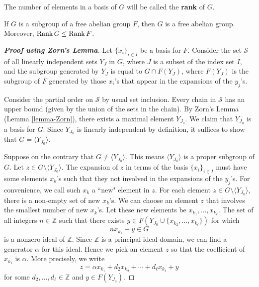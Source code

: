 \begin{definition}
	The number of elements in a basis of $G$ will be called
	the \textbf{rank} of $G$.
\end{definition}
\begin{theorem}  \label{thm-free-abelian-subgrp}
If $G$ is a subgroup of a free abelian group $F$, then $G$ is a free abelian group. Moreover, $\operatorname{Rank}  G \leq \operatorname{Rank}  F$.
\end{theorem}
\begin{proof}[\textbf{Proof using Zorn's Lemma}]
	Let $\{x_i\}_{i \in I}$ be a basis for $F$. Consider the set $\mathcal{S}$ of all linearly independent sets $Y_J$ in $G$, where $J$ is a subset of the index set $I$, and  the subgroup  generated by $Y_J$ is equal to $G \cap F(Y_J)$, where $F(Y_J)$ is the subgroup of $F$ generated by those $x_i$'s that appear in the expansions of the $y_j$'s.
	
	Consider the partial order on $\mathcal{S}$ by usual set inclusion. Every chain in $\mathcal{S}$ has an upper bound (given by the union of the sets in the chain). By Zorn's Lemma (Lemma \ref{lemma-Zorn}), there exists a maximal element $Y_{J_0}$.  We claim that $Y_{J_0}$ is a basis for $G$. Since $Y_{J_0}$ is linearly independent by definition, it suffices to show that $G = \langle Y_{J_0}\rangle$.
	
	Suppose on the contrary that $G \neq  \langle Y_{J_0}\rangle$. This means $\langle Y_{J_0}\rangle$ is a proper subgroup of $G$. Let $z \in G \setminus \langle Y_{J_0}\rangle$. The expansion of $z$ in terms of the basis $\{x_i\}_{i\in I}$ must have some elements $x_k$'s such that they not involved in the expansions of the $y_j$'s. For convenience, we call such $x_k$ a ``new" element in $z$. For each element $z\in G \setminus \langle Y_{J_0}\rangle$, there is a non-empty set of new  $x_k$'s. We can choose an element $z$ that involves the smallest number of new $x_k$'s. Let these new elements be $x_{k_1},\dots, x_{k_\ell}$. The set of all integers $n\in\mathbb{Z}$ such that there exists $y \in F(Y_{J_0}\cup \{x_{k_2},\dots, x_{k_\ell}\})$ for which $$nx_{k_1} + y\in G$$
	is a nonzero ideal of $\mathbb{Z}$. Since $\mathbb{Z}$ is a principal ideal domain, we can find a generator $\alpha$ for this ideal. Hence we pick an element $z$ so that the coefficient of $x_{k_1}$ is $\alpha$. More precisely, we write
	\begin{equation*}
		z = \alpha x_{k_1} + d_2 x_{k_2} + \cdots + d_\ell x_{k_{\ell}} + y
	\end{equation*}
	for some $d_2,\dots, d_\ell\in \mathbb{Z}$ and $y\in F(Y_{J_0})$.
	

\end{proof}
